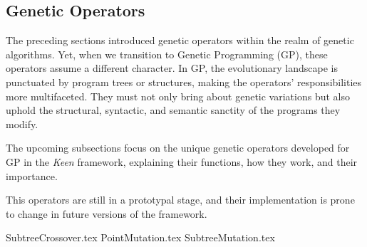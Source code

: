 \subsection{Genetic Operators}
\label{sec:keen:gp:op}
    The preceding sections introduced genetic operators within the realm of genetic 
    algorithms. Yet, when we transition to Genetic Programming (GP), these operators 
    assume a different character. In GP, the evolutionary landscape is punctuated by 
    program trees or structures, making the operators' responsibilities more 
    multifaceted. They must not only bring about genetic variations but also uphold 
    the structural, syntactic, and semantic sanctity of the programs they modify.

    The upcoming subsections focus on the unique genetic operators developed for GP in the \textit{Keen} framework, 
    explaining their functions, how they work, and their importance.

    \begin{remark}
        This operators are still in a prototypal stage, and their implementation
        is prone to change in future versions of the framework.
    \end{remark}

    {SubtreeCrossover.tex}
    {PointMutation.tex}
    {SubtreeMutation.tex}
    